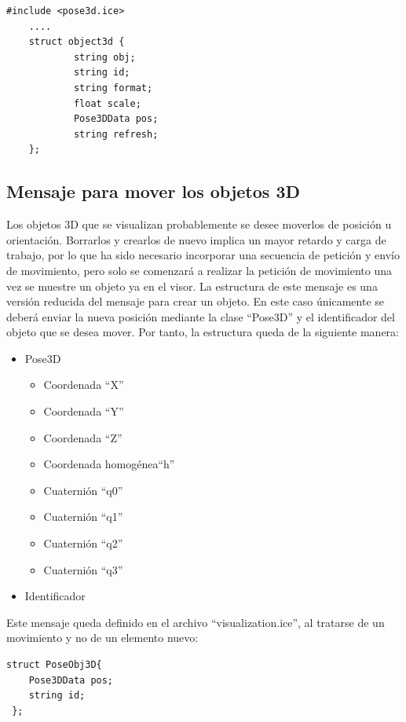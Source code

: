 \begin{lstlisting}[caption= Definición de la estructura del objeto 3D con Slice, label=cod.obj3dslice]
#include <pose3d.ice>
	....
  	struct object3d {
    		string obj;
    		string id;
    		string format;
    		float scale;
    		Pose3DData pos;
    		string refresh;
  	};

 \end{lstlisting}


\subsection{Mensaje para mover los objetos 3D}
Los objetos 3D que se visualizan probablemente se desee moverlos de posición u orientación. Borrarlos y crearlos de nuevo implica un mayor retardo y carga de trabajo, por lo que ha sido necesario incorporar una secuencia de petición y envío de movimiento, pero solo se comenzará a realizar la petición de movimiento una vez se muestre un objeto ya en el visor. La estructura de este mensaje es una versión reducida del mensaje para crear un objeto. En este caso únicamente se deberá enviar la nueva posición mediante la clase ``Pose3D'' y el identificador del objeto que se desea mover. Por tanto, la estructura queda de la siguiente manera:
\begin{itemize}
	\item	Pose3D
	\begin{itemize}
		\item Coordenada ``X''
		\item Coordenada ``Y''
		\item Coordenada ``Z''
		\item Coordenada homogénea``h''
		\item Cuaternión ``q0''
		\item Cuaternión ``q1''
		\item Cuaternión ``q2''
		\item Cuaternión ``q3''
	\end{itemize}
	\item Identificador
\end{itemize}

Este mensaje queda definido en el archivo ``visualization.ice'', al tratarse de un movimiento y no de un elemento nuevo:

\begin{lstlisting}[caption= Definición de la estructura del movimiento de los objetos 3D con Slice, label=cod.movimientoslice]
struct PoseObj3D{
	Pose3DData pos;
	string id;
 };
\end{lstlisting}

